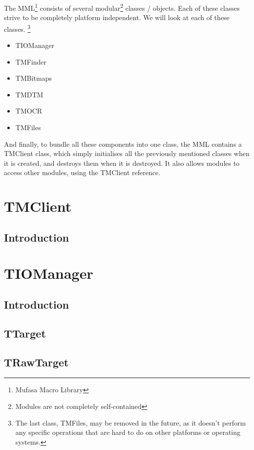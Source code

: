 \documentclass[a4paper, 10pt]{report} %
\begin{document}
The MML\footnote{Mufasa Macro Library} consists of several
modular\footnote{Modules are not completely self-contained}
classes / objects. Each of these classes strive to be
completely platform independent. We will look at each of these classes.
\footnote{
The last class, TMFiles, may be removed in the future, as it doesn't
perform any specific operations that are hard to do on other platforms or
operating systems.
}

\begin{itemize}
    \item   TIOManager
    \item   TMFinder
    \item   TMBitmaps
    \item   TMDTM
    \item   TMOCR
    \item   TMFiles
\end{itemize}

And finally, to bundle all these components into one class, the MML contains a
TMClient class, which simply initialises all the previously mentioned classes
when it is created, and destroys them when it is destroyed. It also allows
modules to access other modules, using the TMClient reference.

\section{TMClient}

\subsection{Introduction}


\section{TIOManager}


\subsection{Introduction}

\subsection{TTarget}
\subsection{TRawTarget}
\end{document}
